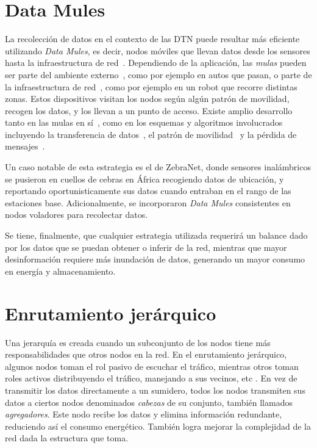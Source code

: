\documentclass[10pt,preprint,onecolumn]{article}
\begin{document}
\section{Data Mules}
\label{sec:mules}

La recolección de datos en el contexto de las DTN puede resultar más eficiente utilizando \emph{Data Mules}, es decir, nodos móviles que llevan datos desde los sensores hasta la infraestructura de red~\cite{datamule1}. Dependiendo de la aplicación, las \emph{mulas} pueden ser parte del ambiente externo~\cite{mulemob}, como por ejemplo en autos que pasan, o parte de la infraestructura de red~\cite{int1}, como por ejemplo en un robot que recorre distintas zonas. Estos dispositivos visitan los nodos según algún patrón de movilidad, recogen los datos, y los llevan a un punto de acceso.
Existe amplio desarrollo tanto en las mulas en sí~\cite{mule1}, como en los esquemas y algoritmos involucrados incluyendo la transferencia de datos~\cite{mulestopwait, mulewindow}, el patrón de movilidad~\cite{mulemob} y la pérdida de mensajes~\cite{muleloss}.

Un caso notable de esta estrategia es el de ZebraNet\cite{11}, donde sensores inalámbricos se pusieron en cuellos de cebras en África recogiendo datos de ubicación, y reportando oportunisticamente sus datos cuando entraban en el rango de las estaciones base. Adicionalmente, se incorporaron \emph{Data Mules} consistentes en nodos voladores para recolectar datos. 

Se tiene, finalmente, que cualquier estrategia utilizada requerirá un balance dado por los datos que se puedan obtener o inferir de la red, mientras que mayor desinformación requiere más inundación de datos, generando un mayor consumo en energía y almacenamiento.


\section{Enrutamiento jerárquico}
\label{sec:hier}

Una jerarquía es creada cuando un subconjunto de los nodos tiene más responsabilidades que otros nodos en la red. En el enrutamiento jerárquico, algunos nodos toman el rol pasivo de escuchar el tráfico, mientras otros toman roles activos distribuyendo el tráfico, manejando a sus vecinos, etc \cite{51}. En vez de transmitir los datos directamente a un sumidero, todos los nodos transmiten sus datos a ciertos nodos denominados \emph{cabezas} de su conjunto, también llamados \emph{agregadores}\cite{105}. Este nodo recibe los datos y elimina información redundante, reduciendo así el consumo energético. También logra mejorar la complejidad de la red dada la estructura que toma. 
\end{document}
